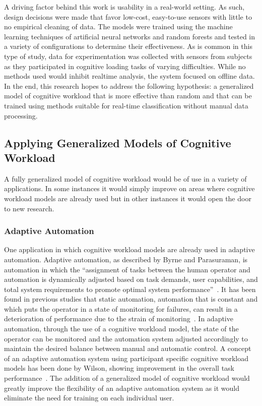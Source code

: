 \documentclass[11pt]{article}
\begin{document}
A driving factor behind this work is usability in a real-world setting. As such, design decisions were made that favor low-cost, easy-to-use sensors with little to no empirical cleaning of data. The models were trained using the machine learning techniques of artificial neural networks and random forests and tested in a variety of configurations to determine their effectiveness. As is common in this type of study, data for experimentation was collected with sensors from subjects as they participated in cognitive loading tasks of varying difficulties. While no methods used would inhibit realtime analysis, the system focused on offline data.  In the end, this research hopes to address the following hypothesis: a generalized model of cognitive workload that is more effective than random and that can be trained using methods suitable for real-time classification without manual data processing.

	\subsection{Applying Generalized Models of Cognitive Workload}
	A fully generalized model of cognitive workload would be of use in a variety of applications. In some instances it would simply improve on areas where cognitive workload models are already used but in other instances it would open the door to new research.
	
		\subsubsection{Adaptive Automation}
		One application in which cognitive workload models are already used in adaptive automation. Adaptive automation, as described by Byrne and Parasuraman, is automation in which the  ``assignment of tasks between the human operator and automation is dynamically adjusted based on task demands, user capabilities, and total system requirements to promote optimal system performance''~\cite{Byrne}. It has been found in previous studies that static automation, automation that is constant and which puts the operator in a state of monitoring for failures, can result in a deterioration of performance due to the strain of monitoring~\cite{Parasuraman_1993, Parasuraman_1997}. In adaptive automation, through the use of a cognitive workload model, the state of the operator can be monitored and the automation system adjusted accordingly to maintain the desired balance between manual and automatic control. A concept of an adaptive automation system using participant specific cognitive workload models has been done by Wilson, showing improvement in the overall task performance~\cite{Wilson_2005}. The addition of a generalized model of cognitive workload would greatly improve the flexibility of an adaptive automation system as it would eliminate the need for training on each individual user.
		
\end{document}
